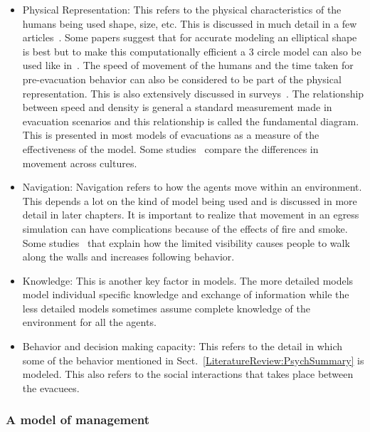 \begin{itemize}
\item Physical Representation: This refers to the physical characteristics of the humans being used shape, size, etc. This is discussed in much detail in a few articles~\cite{Langston:2006kw,Still:2000tp}. Some papers suggest that for accurate modeling an elliptical shape is best but to make this computationally efficient a 3 circle model can also be used like in~\cite{Thompson:1995tm,Langston:2006kw}. The speed of movement of the humans and the time taken for pre-evacuation behavior can also be considered to be part of the physical representation. This is also extensively discussed in surveys~\cite{Fahy:2010to,Proulx:1995wq}. The relationship between speed and density is general a standard measurement made in evacuation scenarios and this relationship is called the fundamental diagram. This is presented in most models of evacuations as a measure of the effectiveness of the model. Some studies~\cite{Chattaraj:2009tja} compare the differences in movement across cultures. %
\item Navigation: Navigation refers to how the agents move within an environment. This depends a lot on the kind of model being used and is discussed in more detail in later chapters. It is important to realize that movement in an egress simulation can have complications because of the effects of fire and smoke. Some studies~\cite{Kobes:2009jx,Isobe:2003ep,Nagai:2004kl} that explain how the limited visibility causes people to walk along the walls and increases following behavior.
\item Knowledge: This is another key factor in models. The more detailed models model individual specific knowledge and exchange of information while the less detailed models sometimes assume complete knowledge of the environment for all the agents.
\item Behavior and decision making capacity: This refers to the detail in which some of the behavior mentioned in Sect.~\ref{LiteratureReview:PsychSummary} is modeled. This also refers to the social interactions that takes place between the evacuees.
\end{itemize}

\subsubsection{A model of management}

